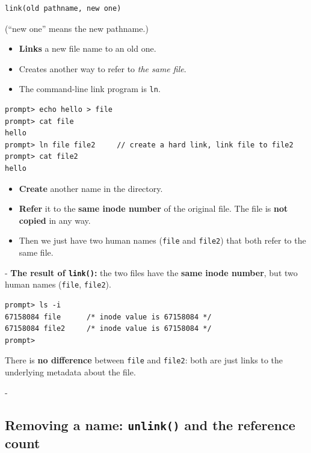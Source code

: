 \documentclass[11pt,a4paper]{article}
\makeatletter
\newcommand{\keepspace}[1]{\par\penalty-100\begingroup
  \setlength{\dimen@}{#1}\dimen@ii\pagegoal\advance\dimen@ii-\pagetotal
  \ifdim\dimen@>\dimen@ii\ifdim\dimen@ii>\z@\vfil\fi\break\fi\endgroup}
\makeatother
\begin{document}
\begin{lstlisting}[numbers=none]
link(old pathname, new one)
\end{lstlisting}
{\small (``new one'' means the new pathname.)}
\begin{itemize}
  \item \textbf{Links} a new file name to an old one.
  \item Creates another way to refer to \emph{the same file}.
  \item The command-line link program is \texttt{ln}.
\end{itemize}

\begin{lstlisting}[style=term]
prompt> echo hello > file
prompt> cat file
hello
prompt> ln file file2     // create a hard link, link file to file2
prompt> cat file2
hello
\end{lstlisting}

\begin{defbox}
\begin{itemize}
  \item \textbf{Create} another name in the directory.
  \item \textbf{Refer} it to the \textbf{same inode number} of the original
        file. The file is \textbf{not copied} in any way.
  \item Then we just have two human names (\texttt{file} and
        \texttt{file2}) that both refer to the same file.
\end{itemize}
\end{defbox}

\keepspace{7\baselineskip}
\textbf{The result of \texttt{link()}:} the two files have the \textbf{same
inode number}, but two human names (\texttt{file}, \texttt{file2}).

\begin{lstlisting}[style=term]
prompt> ls -i
67158084 file      /* inode value is 67158084 */
67158084 file2     /* inode value is 67158084 */
prompt>
\end{lstlisting}

There is \textbf{no difference} between \texttt{file} and \texttt{file2}:
both are just links to the underlying metadata about the file.

\keepspace{7\baselineskip}
\subsection{Removing a name: \texttt{unlink()} and the reference count}
\end{document}
